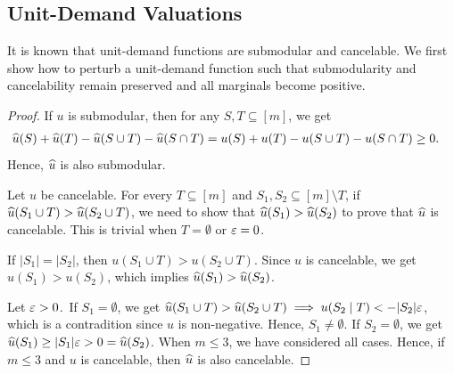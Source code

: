 \subsection{Unit-Demand Valuations}
\label{sec:cex-extra:unit-demand}

It is known that unit-demand functions are submodular and cancelable.
We first show how to perturb a unit-demand function such that
submodularity and cancelability remain preserved and all marginals become positive.

\begin{proof}
If $u$ is submodular, then for any $S, T \subseteq [m]$, we get
\begin{align*}
& \widehat{u}(S) + \widehat{u}(T) - \widehat{u}(S \cup T) - \widehat{u}(S \cap T)
    \relax= u(S) + u(T) - u(S \cup T) - u(S \cap T) \ge 0.
\end{align*}
Hence, $\widehat{u}$ is also submodular.

Let $u$ be cancelable.
For every $T \subseteq [m]$ and $S_1, S_2 \subseteq [m] \setminus T$,
if $\widehat{u}(S_1 \cup T) > \widehat{u}(S_2 \cup T)$,
we need to show that $\widehat{u}(S_1) > \widehat{u}(S_2)$
to prove that $\widehat{u}$ is cancelable.
This is trivial when $T = \emptyset$ or $\varepsilon = 0$.

If $|S_1| = |S_2|$, then $u(S_1 \cup T) > u(S_2 \cup T)$.
Since $u$ is cancelable, we get $u(S_1) > u(S_2)$, which implies $\widehat{u}(S_1) > \widehat{u}(S_2)$.

Let $\varepsilon > 0$. If $S_1 = \emptyset$, we get
$\widehat{u}(S_1 \cup T) > \widehat{u}(S_2 \cup T) \implies u(S_2 \mid T) < - |S_2|\varepsilon$,
which is a contradition since $u$ is non-negative. Hence, $S_1 \neq \emptyset$.
If $S_2 = \emptyset$, we get $\widehat{u}(S_1) \ge |S_1|\varepsilon > 0 = \widehat{u}(S_2)$.
When $m \le 3$, we have considered all cases.
Hence, if $m \le 3$ and $u$ is cancelable, then $\widehat{u}$ is also cancelable.
\end{proof}

